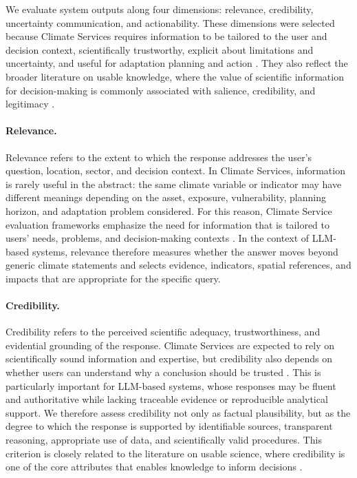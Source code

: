 We evaluate system outputs along four dimensions: relevance, credibility, uncertainty communication, and actionability. These dimensions were selected because Climate Services requires information to be tailored to the user and decision context, scientifically trustworthy, explicit about limitations and uncertainty, and useful for adaptation planning and action \citep{lemos_narrowing_2012, hewitt_global_2012, vaughan_climate_2014, jahan_assessing_2023, boon_defining_2024, boon_developing_2025}. They also reflect the broader literature on usable knowledge, where the value of scientific information for decision-making is commonly associated with salience, credibility, and legitimacy \citep{cash_knowledge_2003, dilling_creating_2011, mcnie_delivering_2013}.

\paragraph{Relevance.}
Relevance refers to the extent to which the response addresses the user's question, location, sector, and decision context. In Climate Services, information is rarely useful in the abstract: the same climate variable or indicator may have different meanings depending on the asset, exposure, vulnerability, planning horizon, and adaptation problem considered. For this reason, Climate Service evaluation frameworks emphasize the need for information that is tailored to users' needs, problems, and decision-making contexts \citep{vaughan_climate_2014, jahan_assessing_2023, boon_developing_2025}. In the context of LLM-based systems, relevance therefore measures whether the answer moves beyond generic climate statements and selects evidence, indicators, spatial references, and impacts that are appropriate for the specific query.

\paragraph{Credibility.}
Credibility refers to the perceived scientific adequacy, trustworthiness, and evidential grounding of the response. Climate Services are expected to rely on scientifically sound information and expertise, but credibility also depends on whether users can understand why a conclusion should be trusted \citep{hewitt_global_2012, vaughan_climate_2014}. This is particularly important for LLM-based systems, whose responses may be fluent and authoritative while lacking traceable evidence or reproducible analytical support. We therefore assess credibility not only as factual plausibility, but as the degree to which the response is supported by identifiable sources, transparent reasoning, appropriate use of data, and scientifically valid procedures. This criterion is closely related to the literature on usable science, where credibility is one of the core attributes that enables knowledge to inform decisions \citep{cash_knowledge_2003, dilling_creating_2011, mcnie_delivering_2013}.

